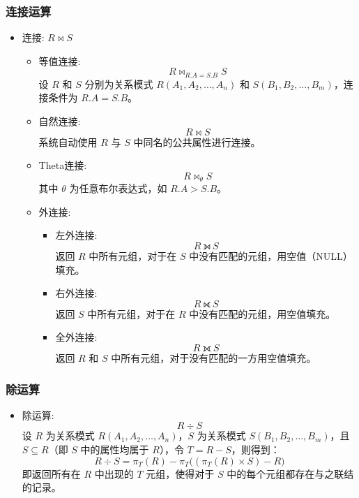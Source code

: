 \subsubsection{连接运算}
\begin{itemize}
    \item 连接: $R \bowtie S$
    \begin{itemize}
        \item 等值连接: 
        \[
        R \bowtie_{R.A = S.B} S
        \]
        设 $R$ 和 $S$ 分别为关系模式 $R(A_1, A_2, \ldots, A_n)$ 和 $S(B_1, B_2, \ldots, B_m)$，连接条件为 $R.A = S.B$。
        \item 自然连接:
        \[
        R \bowtie S
        \]
        系统自动使用 $R$ 与 $S$ 中同名的公共属性进行连接。
        \item Theta连接: 
        \[
        R \bowtie_{\theta} S
        \]
        其中 $\theta$ 为任意布尔表达式，如 $R.A > S.B$。
        \item 外连接:
        \begin{itemize}
            \item 左外连接:
            \[
            R \ \text{⟕}\ S
            \]
            返回 $R$ 中所有元组，对于在 $S$ 中没有匹配的元组，用空值（NULL）填充。
            \item 右外连接:
            \[
            R \ \text{⟖}\ S
            \]
            返回 $S$ 中所有元组，对于在 $R$ 中没有匹配的元组，用空值填充。
            \item 全外连接:
            \[
            R \ \text{⟗}\ S
            \]
            返回 $R$ 和 $S$ 中所有元组，对于没有匹配的一方用空值填充。
        \end{itemize}
    \end{itemize}
\end{itemize}

\subsubsection{除运算}
\begin{itemize}
    \item 除运算:
    \[
    R \div S
    \]
    设 $R$ 为关系模式 $R(A_1, A_2, \ldots, A_n)$，$S$ 为关系模式 $S(B_1, B_2, \ldots, B_m)$，且 $S \subseteq R$（即 $S$ 中的属性均属于 $R$），令 $T = R - S$，则得到：
    \[
    R \div S = \pi_T(R) - \pi_T\Big((\pi_T(R) \times S) - R\Big)
    \]
    即返回所有在 $R$ 中出现的 $T$ 元组，使得对于 $S$ 中的每个元组都存在与之联结的记录。
\end{itemize}

